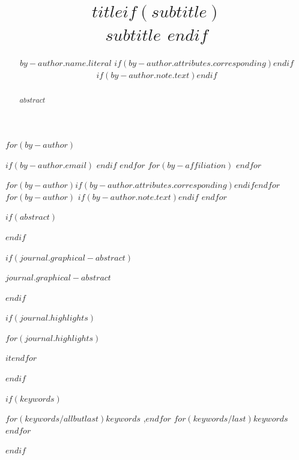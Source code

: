 
\begin{frontmatter}
\title{$title$$if(subtitle)$ \\\large{$subtitle$} $endif$}
$for(by-author)$\author[$for(by-author.affiliations)$$it.number$$sep$,$endfor$]{$by-author.name.literal$%
$if(by-author.attributes.corresponding)$$endif$%
$if(by-author.note.text)$$endif$}
$if(by-author.email)$  $endif$
$endfor$
$for(by-affiliation)$
$endfor$

$for(by-author)$$if(by-author.attributes.corresponding)$$endif$$endfor$
$for(by-author)$
$if(by-author.note.text)$$endif$
$endfor$
        
$if(abstract)$
\begin{abstract}
$abstract$
\end{abstract}
$endif$

$if(journal.graphical-abstract)$\begin{graphicalabstract}
$journal.graphical-abstract$
\end{graphicalabstract}
$endif$

$if(journal.highlights)$\begin{highlights}
$for(journal.highlights)$\item $it$$endfor$
\end{highlights}
$endif$

$if(keywords)$
\begin{keyword}
    $for(keywords/allbutlast)$$keywords$ \sep $endfor$
    $for(keywords/last)$$keywords$$endfor$
\end{keyword}
$endif$
\end{frontmatter}
    